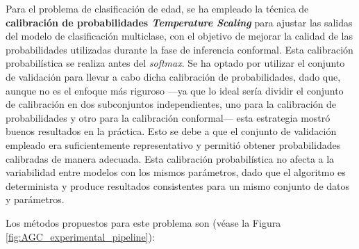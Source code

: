 Para el problema de clasificación de edad, se ha empleado la técnica de \textbf{calibración de probabilidades \textit{Temperature Scaling}} para ajustar las salidas del modelo de clasificación multiclase, con el objetivo de mejorar la calidad de las probabilidades utilizadas durante la fase de inferencia conformal. Esta calibración probabilística se realiza antes del \textit{softmax}. Se ha optado por utilizar el conjunto de validación para llevar a cabo dicha calibración de probabilidades, dado que, aunque no es el enfoque más riguroso ---ya que lo ideal sería dividir el conjunto de calibración en dos subconjuntos independientes, uno para la calibración de probabilidades y otro para la calibración conformal--- esta estrategia mostró buenos resultados en la práctica. Esto se debe a que el conjunto de validación empleado era suficientemente representativo y permitió obtener probabilidades calibradas de manera adecuada. Esta calibración probabilística no afecta a la variabilidad entre modelos con los mismos parámetros, dado que el algoritmo es determinista y produce resultados consistentes para un mismo conjunto de datos y parámetros. 

Los métodos propuestos para este problema son (véase la Figura \ref{fig:AGC_experimental_pipeline}):

